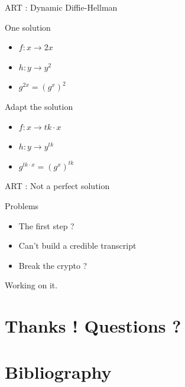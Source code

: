 \documentclass{beamer}
\newcommand{\ra}{\rightarrow}
\begin{document}
\begin{frame}{ART : Dynamic Diffie-Hellman}
	\begin{block}{One solution}
		\begin{itemize}
			\item $f : x \ra 2x$
			\item $h : y \ra y^2$
			\item $g^{2x} = (g^x)^2$
		\end{itemize}
	\end{block}
	\pause
	\begin{block}{Adapt the solution}
		\begin{itemize}
			\item $f : x \ra tk\cdot x$
			\item $h : y \ra y^{tk}$
			\item $g^{tk\cdot x} = (g^x)^{tk}$
		\end{itemize}
	\end{block}
\end{frame}

\begin{frame}{ART : Not a perfect solution}
	\begin{block}{Problems}
		\begin{itemize}
			\item The first step ?
			\item Can't build a credible transcript
			\item Break the crypto ?
		\end{itemize}
	\end{block}
	\center
	Working on it.
\end{frame}
\section*{Thanks ! Questions ?}

\section*{Bibliography}
\begin{frame}
  \begin{small}

    
    
	\end{small}
\end{frame}
\end{document}
